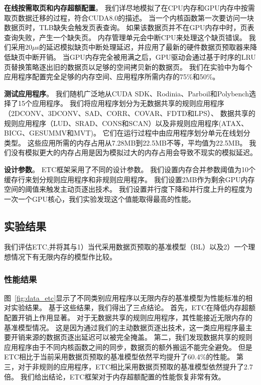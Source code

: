 \textbf{在线按需取页和内存超额配置}。
我们详尽地模拟了在CPU内存和GPU内存中按需取页数据迁移的过程，符合CUDA8.0的描述。
当一个内核函数第一次要访问一块数据页时，TLB缺失会触发页表查询。
如果该数据页并不在GPU内存中时，页表查询失败，产生一个缺失页。
内存管理单元会中断CPU来处理这个缺页错误。
我们采用20$\mu$s的延迟模拟缺页中断处理延迟，并应用了最新的硬件数据页预取器来降低缺页中断开销。
当GPU内存完全被用满之后，GPU驱动会通过基于时序的LRU页替换策略逐出旧的数据页以足够的空间拷贝新的数据页。
我们在实验中为每个应用程序配置完全足够的内存空间、应用程序所需内存的75\%和50\%。

\textbf{测试应用程序}。
我们随机广泛地从CUDA SDK、Rodinia、Parboil和Polybench选择了15个应用程序。
我们将应用程序划分为无数据共享的规则应用程序（2DCONV、3DCONV、SAD、CORR、COVAR、FDTD和LPS）、
数据共享的规则应用程序（LUD、SRAD、CONS和SCAN）以及非规则应用程序(ATAX、BICG、GESUMMV和MVT)。
它们在运行过程中由应用程序划分单元在线划分类型。
这些应用所需的内存占用从7.28MB到22.5MB不等，平均值为22.5MB。
我们没有模拟更大的内存占用是因为模拟过大的内存占用会导致不现实的模拟延迟。

\textbf{设计参数}。
ETC框架采用了不同的设计参数。
我们设置内存合并参数阈值为10个缓存行来划分规则应用程序和非规则应用程序。
我们设置2MB作为剩余GPU内存空间的阈值来触发主动页逐出技术。
我们设置并行度下降和并行度上升的程度为一次一个GPU核心，我们实验发现这个值能取得最高的性能。


\subsection{实验结果}
我们评估ETC,并将其与1）当代采用数据页预取的基准模型（BL）以及2）一个理想情况下有无限内存的模型作比较。

\subsubsection{性能结果}

图~\ref{fig:data_etc}显示了不同类别应用程序以无限内存的基准模型为性能标准的相对实验结果。
基于这些结果，我们得出了三点结论。
首先，ETC在降低内存超额配置开销上作用显著。
对于无数据共享的规则应用程序，其性能接近无限内存的基准模型情况。
这是因为通过我们的主动数据页逐出技术，这一类应用程序最主要开销来源的数据页逐出延迟可以被完全掩盖。
第二，我们发现数据共享的规则应用程序由于不同内核函数之间的同步，数据页的额外搬运不能完全避免。
但是ETC相比于当前采用数据页预取的基准模型依然平均提升了60.4\%的性能。
第三，对于非规则的应用程序，ETC相比采用数据页预取的基准模型依然提升了2.7倍。
我们给出结论，ETC框架对于内存超额配置的性能恢复非常有效。

